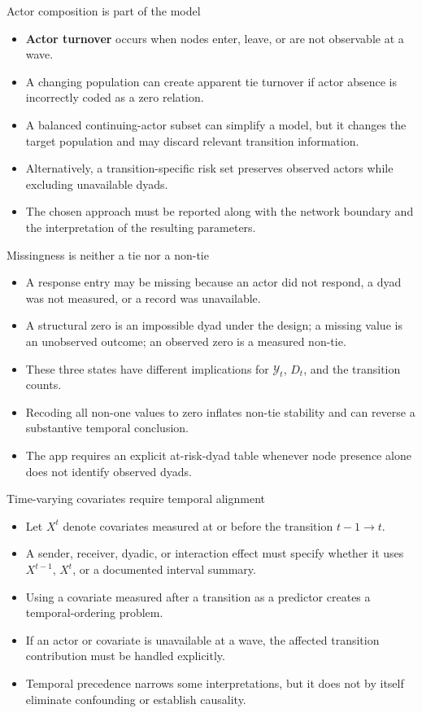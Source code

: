 \documentclass[aspectratio=169,11pt]{beamer}
\newcommand{\term}[1]{\textbf{\color{nupurple}#1}}
\begin{document}
\begin{frame}{Actor composition is part of the model}
\begin{itemize}
\item \term{Actor turnover} occurs when nodes enter, leave, or are not observable at a wave.
\item A changing population can create apparent tie turnover if actor absence is incorrectly coded as a zero relation.
\item A balanced continuing-actor subset can simplify a model, but it changes the target population and may discard relevant transition information.
\item Alternatively, a transition-specific risk set preserves observed actors while excluding unavailable dyads.
\item The chosen approach must be reported along with the network boundary and the interpretation of the resulting parameters.
\end{itemize}
\end{frame}

\begin{frame}{Missingness is neither a tie nor a non-tie}
\begin{itemize}
\item A response entry may be missing because an actor did not respond, a dyad was not measured, or a record was unavailable.
\item A structural zero is an impossible dyad under the design; a missing value is an unobserved outcome; an observed zero is a measured non-tie.
\item These three states have different implications for $\mathcal{Y}_t$, $D_t$, and the transition counts.
\item Recoding all non-one values to zero inflates non-tie stability and can reverse a substantive temporal conclusion.
\item The app requires an explicit at-risk-dyad table whenever node presence alone does not identify observed dyads.
\end{itemize}
\end{frame}

\begin{frame}{Time-varying covariates require temporal alignment}
\begin{itemize}
\item Let $X^t$ denote covariates measured at or before the transition $t-1\to t$.
\item A sender, receiver, dyadic, or interaction effect must specify whether it uses $X^{t-1}$, $X^t$, or a documented interval summary.
\item Using a covariate measured after a transition as a predictor creates a temporal-ordering problem.
\item If an actor or covariate is unavailable at a wave, the affected transition contribution must be handled explicitly.
\item Temporal precedence narrows some interpretations, but it does not by itself eliminate confounding or establish causality.
\end{itemize}
\end{frame}
\end{document}
